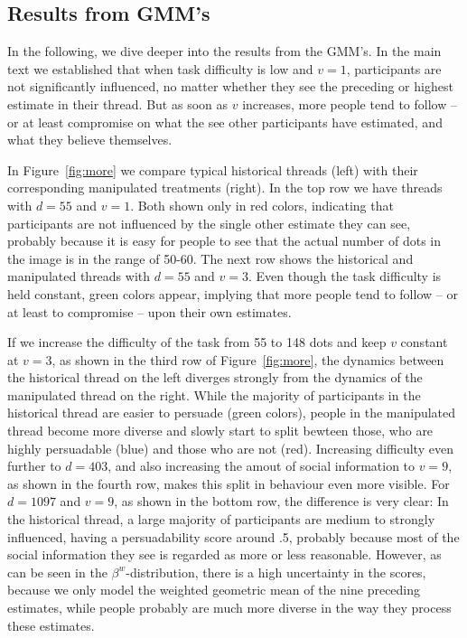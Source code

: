 \documentclass[9pt,a4paper,twocolumn,lineno]{article}
\begin{document}
\subsection*{Results from GMM's}
In the following, we dive deeper into the results from the GMM's. In the main text we established that when task difficulty is low and $v=1$, participants are not significantly influenced, no matter whether they see the preceding or highest estimate in their thread. But as soon as $v$ increases, more people tend to follow – or at least compromise on what the see other participants have estimated, and what they believe themselves. 

In Figure~\ref{fig:more} we compare typical historical threads (left) with their corresponding manipulated treatments (right). In the top row we have threads with $d=55$ and $v=1$. Both shown only in red colors, indicating that participants are not influenced by the single other estimate they can see, probably because it is easy for people to see that the actual number of dots in the image is in the range of 50-60. The next row shows the historical and manipulated threads with $d=55$ and $v=3$. Even though the task difficulty is held constant, green colors appear, implying that more people tend to follow – or at least to compromise – upon their own estimates. %

If we increase the difficulty of the task from 55 to 148 dots and keep $v$ constant at $v=3$, as shown in the third row of Figure~\ref{fig:more}, the dynamics between the historical thread on the left diverges strongly from the dynamics of the manipulated thread on the right. While the majority of participants in the historical thread are easier to persuade (green colors), people in the manipulated thread become more diverse and slowly start to split bewteen those, who are highly persuadable (blue) and those who are not (red). Increasing difficulty even further to $d=403$, and also increasing the amout of social information to $v=9$, as shown in the fourth row, makes this split in behaviour even more visible. For $d=1097$ and $v=9$, as shown in the bottom row, the difference is very clear: In the historical thread, a large majority of participants are medium to strongly influenced, having a persuadability score around .5, probably because most of the social information they see is regarded as more or less reasonable. However, as can be seen in the $\beta^w$-distribution, there is a high uncertainty in the scores, because we only model the weighted geometric mean of the nine preceding estimates, while people probably are much more diverse in the way they process these estimates. 
\end{document}
